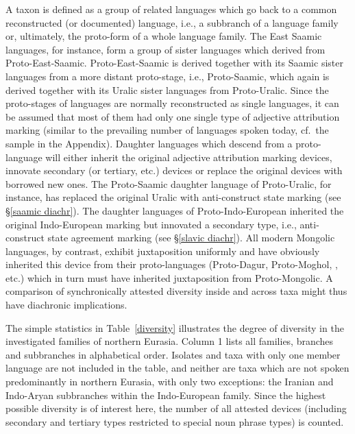 A taxon is defined as a group of related languages which go back to a common reconstructed (or documented) language, i.e., a subbranch of a language family or, ultimately, the proto-form of a whole language family. The East Saamic languages, for instance, form a group of sister languages which derived from Proto\hyp{}East-Saamic. Proto\hyp{}East-Saamic is derived together with its Saamic sister languages from a more distant proto-stage, i.e., Proto\hyp{}Saamic, which again is derived together with its Uralic sister languages from Proto\hyp{}Uralic. Since the proto-stages of languages are normally reconstructed as single languages, it can be assumed that most of them had only one single type of adjective attribution marking (similar to the prevailing number of languages spoken today, cf.~the sample in the Appendix). Daughter languages which descend from a proto-language will either inherit the original adjective attribution marking devices, innovate secondary (or tertiary, etc.) devices or replace the original devices with borrowed new ones. The Proto\hyp{}Saamic daughter language of Proto\hyp{}Uralic, for instance, has replaced the original Uralic  with anti\hyp{}construct state marking (see \S\ref{saamic diachr}). The  daughter languages of Proto\hyp{}Indo-European inherited the original Indo-European  marking but innovated a secondary type, i.e., anti\hyp{}construct state agreement marking (see \S\ref{slavic diachr}). All modern Mongolic languages, by contrast, exhibit juxtaposition uniformly and have obviously inherited this device from their proto-languages (Proto\hyp{}Dagur, Proto\hyp{}Moghol, , etc.) which in turn must have inherited juxtaposition from Proto\hyp{}Mongolic. A comparison of synchronically attested diversity inside and across taxa might thus have diachronic implications.

The simple statistics in Table~\ref{diversity} illustrates the degree of diversity in the investigated families of northern Eurasia. Column 1 lists all families, branches and subbranches in alphabetical order. Isolates and taxa with only one member language are not included in the table, and neither are taxa which are not spoken predominantly in northern Eurasia, with only two exceptions: the Iranian and Indo-Aryan subbranches within the Indo-European family. Since the highest possible diversity is of interest here, the number of all attested devices (including secondary and tertiary types restricted to special noun phrase types) is counted. 

